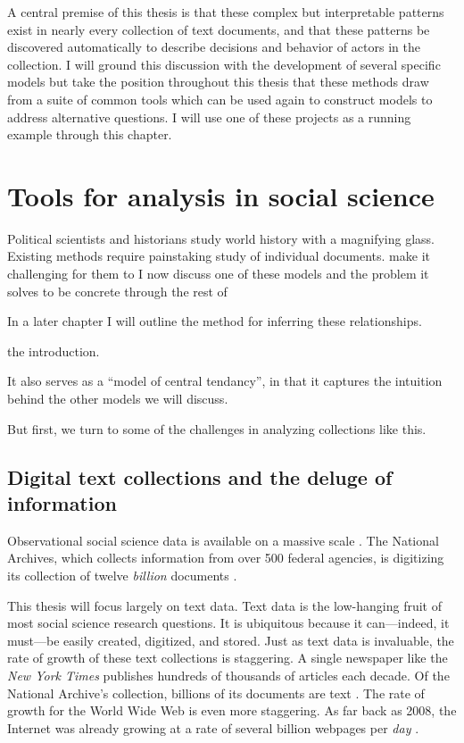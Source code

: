A central premise of this thesis is that these complex but
interpretable patterns exist in nearly every collection of text
documents, and that these patterns be discovered automatically to
describe decisions and behavior of actors in the collection.  I will
ground this discussion with the development of several specific models
but take the position throughout this thesis that these methods draw
from a suite of common tools which can be used again to construct
models to address alternative questions.  I will use one of these
projects as a running example through this chapter.

\section*{Tools for analysis in social science}

Political scientists and historians study world history with a
magnifying glass.  Existing methods require painstaking study of
individual documents.   make it challenging for them to I now discuss one of these
models and the problem it solves to be concrete through the rest of

In a later chapter I will outline the method for inferring these relationships.

the introduction.

It also serves as a ``model of central
tendancy'', in that it captures the intuition behind the other models
we will discuss.


But first, we turn to some of the challenges in analyzing collections like this.

\subsection*{Digital text collections and the deluge of information}
Observational social science data is available on a massive scale
\cite{lazer:2009}. The National Archives, which collects information
from over 500 federal agencies, is digitizing its collection of twelve
\emph{billion} documents
\cite{national_archives:2012a,national_archives:2012b}.

This thesis will focus largely on text data.  Text data is the
low-hanging fruit of most social science research questions.  It is
ubiquitous because it can---indeed, it must---be easily created,
digitized, and stored.  Just as text data is invaluable, the rate of
growth of these text collections is staggering.  A single newspaper
like the \emph{New York Times} publishes hundreds of thousands of
articles each decade.  Of the National Archive's collection, billions
of its documents are text
\cite{national_archives:2012a,national_archives:2012b}.  The rate of
growth for the World Wide Web is even more staggering.  As far back as
2008, the Internet was already growing at a rate of several billion
webpages per \emph{day} \cite{googleblog:2008}.

